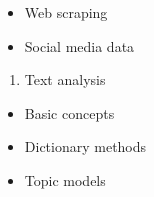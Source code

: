 \documentclass[11pt,]{article}
\providecommand{\tightlist}{%
  \setlength{\itemsep}{0pt}\setlength{\parskip}{0pt}}
\begin{document}
\begin{itemize}
\tightlist
\item
  Web scraping
\item
  Social media data
\end{itemize}

\begin{enumerate}
\def\labelenumi{\arabic{enumi}.}
\setcounter{enumi}{3}
\tightlist
\item
  Text analysis
\end{enumerate}

\begin{itemize}
\tightlist
\item
  Basic concepts
\item
  Dictionary methods
\item
  Topic models
\end{itemize}
\end{document}
